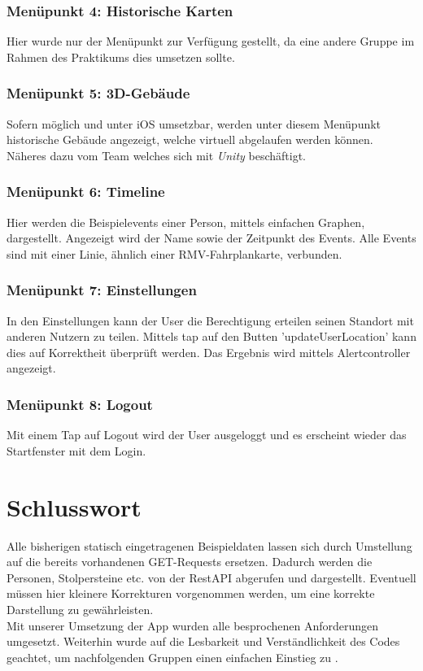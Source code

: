 \documentclass[a4paper, 11pt]{report}
\begin{document}
	\subsubsection{Menüpunkt 4: Historische Karten}
	
	Hier wurde nur der Menüpunkt zur Verfügung gestellt, da eine andere Gruppe im Rahmen des Praktikums dies umsetzen sollte.
	
	\subsubsection{Menüpunkt 5: 3D-Gebäude}
	
	Sofern möglich und unter iOS umsetzbar, werden unter diesem Menüpunkt historische Gebäude angezeigt, welche virtuell abgelaufen werden können. Näheres dazu vom Team welches sich mit \textit{Unity} beschäftigt.
	
	\subsubsection{Menüpunkt 6: Timeline}
	
	Hier werden die Beispielevents einer Person, mittels einfachen Graphen, dargestellt. Angezeigt wird der Name sowie der Zeitpunkt des Events. Alle Events sind mit einer Linie, ähnlich einer RMV-Fahrplankarte, verbunden.
	
	\subsubsection{Menüpunkt 7: Einstellungen}
	
	In den Einstellungen kann der User die Berechtigung erteilen seinen Standort mit anderen Nutzern zu teilen. Mittels tap auf den Butten 'updateUserLocation' kann dies auf Korrektheit überprüft werden. Das Ergebnis wird mittels Alertcontroller angezeigt.
	
	\subsubsection{Menüpunkt 8: Logout}
	
	Mit einem Tap auf Logout wird der User ausgeloggt und es erscheint wieder das Startfenster mit dem Login.
	
	\section*{Schlusswort}
	
	Alle bisherigen statisch eingetragenen Beispieldaten lassen sich durch Umstellung auf die bereits vorhandenen GET-Requests ersetzen. Dadurch werden die Personen, Stolpersteine etc. von der RestAPI abgerufen und dargestellt. Eventuell müssen hier kleinere Korrekturen vorgenommen werden, um eine korrekte Darstellung zu gewährleisten.\\
	Mit unserer Umsetzung der App wurden alle besprochenen Anforderungen umgesetzt. Weiterhin wurde auf die Lesbarkeit und Verständlichkeit des Codes geachtet, um nachfolgenden Gruppen einen einfachen Einstieg zu .
	
	
\end{document}

